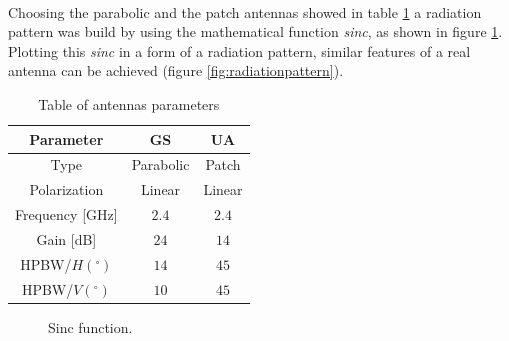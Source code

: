 \paragraph{}Choosing the parabolic and the patch antennas showed in table \ref{table:1} a radiation pattern was build by using the mathematical function \textit{sinc}, as shown in figure \ref{fig:sinc}.
Plotting this \textit{sinc} in a form of a radiation pattern, similar features of a real antenna can be achieved (figure \ref{fig:radiationpattern}).

\begin{table}[h]
	\centering
	\begin{tabular}{|c||c|c|}
		\hline
		Parameter & GS & UA\\ \hline\hline
		Type & Parabolic & Patch\\ \hline
		Polarization & Linear & Linear\\ \hline
		Frequency [GHz] & $2.4$ & $2.4$\\ \hline
		Gain [dB] & $24$ & $14$\\ \hline
		HPBW/$H(^{\circ})$ & $14$ & $45$\\ \hline
		HPBW/$V(^{\circ})$ & $10$ & $45$\\ \hline
	\end{tabular}
	\caption{Table of antennas parameters}
	\label{table:1}
\end{table}

\begin{figure}[H]
\hfill
{}
\hfill
{}
\hfill
\caption{Sinc function.}
\label{fig:sinc}
\end{figure}

